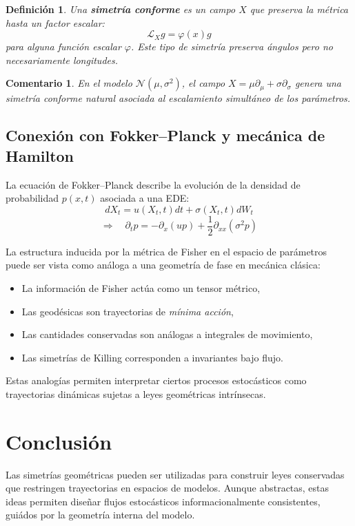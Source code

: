 \documentclass[11pt]{article}
\newtheorem{definition}{Definici\'on}
\newtheorem{remark}{Comentario}
\begin{document}
	\begin{definition}
		Una \textbf{simetr\'ia conforme} es un campo $X$ que preserva la m\'etrica hasta un factor escalar:
		\[
		\mathcal{L}_X g = \varphi(x) g
		\]
		para alguna funci\'on escalar $\varphi$. Este tipo de simetr\'ia preserva \emph{\'angulos} pero no necesariamente \emph{longitudes}.
	\end{definition}
	
	\begin{remark}
		En el modelo $\mathcal{N}(\mu, \sigma^2)$, el campo $X = \mu \partial_\mu + \sigma \partial_\sigma$ genera una simetr\'ia conforme natural asociada al escalamiento simult\'aneo de los par\'ametros.
	\end{remark}
	
	\subsection*{Conexi\'on con Fokker–Planck y mec\'anica de Hamilton}
	
	La ecuaci\'on de Fokker–Planck describe la evoluci\'on de la densidad de probabilidad $p(x,t)$ asociada a una EDE:
	\[
	dX_t = u(X_t, t) dt + \sigma(X_t, t) dW_t
	\]
	\[
	\Rightarrow \quad \partial_t p = -\partial_x (u p) + \frac{1}{2} \partial_{xx} (\sigma^2 p)
	\]
	
	La estructura inducida por la m\'etrica de Fisher en el espacio de par\'ametros puede ser vista como an\'aloga a una geometr\'ia de fase en mec\'anica cl\'asica:
	
	\begin{itemize}
		\item La informaci\'on de Fisher act\'ua como un tensor m\'etrico,
		\item Las geod\'esicas son trayectorias de \emph{m\'inima acci\'on},
		\item Las cantidades conservadas son an\'alogas a integrales de movimiento,
		\item Las simetr\'ias de Killing corresponden a invariantes bajo flujo.
	\end{itemize}
	
	Estas analog\'ias permiten interpretar ciertos procesos estoc\'asticos como trayectorias din\'amicas sujetas a leyes geom\'etricas intr\'insecas.
	
	\section{Conclusi\'on}
	
	Las simetr\'ias geom\'etricas pueden ser utilizadas para construir leyes conservadas que restringen trayectorias en espacios de modelos. Aunque abstractas, estas ideas permiten dise\~nar flujos estoc\'asticos informacionalmente consistentes, gui\'ados por la geometr\'ia interna del modelo.
	
\end{document}
